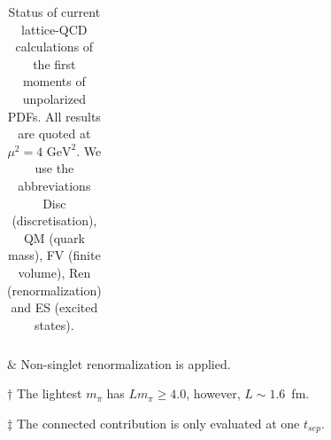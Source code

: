 \begin{table}[!t]
\begin{threeparttable}
\begin{tabular}{llcllccccccl}
\bottomrule
\end{tabular}
\begin{tablenotes}
\scriptsize
\item[$\&$] Non-singlet renormalization is applied.
\item[$\dagger$] The lightest $m_\pi$ has $Lm_\pi\ge 4.0$, however, 
$L\sim 1.6$~fm.
\item[$\ddag$] The connected contribution is only evaluated at one $t_{sep}$.
\end{tablenotes}
\end{threeparttable}
\caption{\small Status of current lattice-QCD calculations of the first 
moments of unpolarized PDFs.
%
All results are quoted at $\mu^2=4\mbox{ GeV}^2$.
%
We use the abbreviations Disc (discretisation), QM (quark mass),
FV (finite volume), Ren (renormalization) and ES (excited states).}
\label{tab:unpolLQCDstatus1B}
\end{table}

